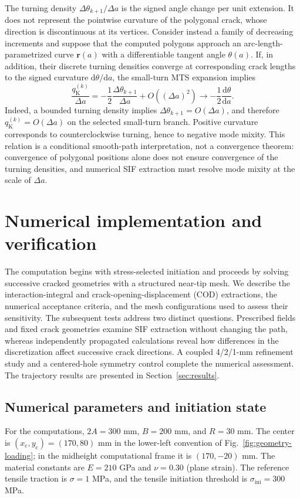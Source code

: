\documentclass[pdflatex,sn-mathphys-num]{sn-jnl}
\newcommand{\dd}{\mathrm{d}}
\newcommand{\PlateAMM}{300}
\newcommand{\HoleCxMM}{170}
\newcommand{\HoleCyMM}{-20}
\newcommand{\HoleRMM}{30}
\begin{document}
The turning density $\Delta\theta_{k+1}/\Delta a$ is the signed
angle change per unit extension. It does not represent the
pointwise curvature of the polygonal crack, whose direction is
discontinuous at its vertices. Consider instead a family of
decreasing increments and suppose that the computed polygons
approach an arc-length-parametrized curve $\bm r(a)$ with a
differentiable tangent angle $\theta(a)$. If, in addition, their
discrete turning densities converge at corresponding crack lengths
to the signed curvature $\dd\theta/\dd a$, the small-turn
MTS expansion implies
\begin{equation}
 \frac{q_{\mathrm{K}}^{(k)}}{\Delta a}
 =-\frac12\frac{\Delta\theta_{k+1}}{\Delta a}
  +O((\Delta a)^2)
 \longrightarrow-\frac12\frac{\dd\theta}{\dd a}.
 \label{eq:curvature-mts}
\end{equation}
Indeed, a bounded turning density implies
$\Delta\theta_{k+1}=O(\Delta a)$, and therefore
$q_{\mathrm{K}}^{(k)}=O(\Delta a)$ on the selected small-turn
branch. Positive curvature corresponds to counterclockwise
turning, hence to negative mode mixity. This relation is a
conditional smooth-path interpretation, not a convergence
theorem: convergence of polygonal positions alone does not ensure
convergence of the turning densities, and numerical SIF extraction
must resolve mode mixity at the scale of $\Delta a$.

\section{Numerical implementation and verification}
\label{sec:numerics}
The computation begins with stress-selected initiation and proceeds by
solving successive cracked geometries with a structured near-tip mesh.
We describe the interaction-integral and crack-opening-displacement
(COD) extractions, the numerical acceptance criteria, and the
mesh configurations used to assess their sensitivity. The subsequent
tests address two distinct questions. Prescribed fields and fixed
crack geometries examine SIF extraction without changing the path,
whereas independently propagated calculations reveal how differences
in the discretization affect successive crack directions. A coupled
4/2/1-mm refinement study and a centered-hole symmetry control
complete the numerical assessment. The trajectory results are
presented in Section~\ref{sec:results}.

\subsection{Numerical parameters and initiation state}
\label{sec:numerical-parameters}
For the computations, $2A=\PlateAMM$ mm, $B=200$ mm, and
$R=\HoleRMM$ mm. The center is $(x_{\mathrm{c}},y_{\mathrm{c}})=(170,80)$ mm in the
lower-left convention of Fig.~\ref{fig:geometry-loading}; in the
midheight computational frame it is
$(\HoleCxMM,\HoleCyMM)$ mm. The material constants are
$E=210$ GPa and $\nu=0.30$ (plane strain). The reference
tensile traction is $\sigma=1$ MPa, and the tensile initiation
threshold is $\sigma_{\mathrm{ini}}=300$ MPa.
\end{document}
